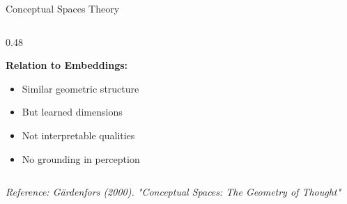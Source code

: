 \documentclass[aspectratio=169]{beamer}
\begin{document}
\begin{frame}[shrink=10]{Conceptual Spaces Theory 🌌}
\begin{columns}[T]
\begin{column}{0.48\textwidth}
\begin{center}
\end{center}

\vspace{0.5em}
\textbf{Relation to Embeddings:}
\begin{itemize}\setlength{\itemsep}{0pt}
    \item Similar geometric structure
    \item But learned dimensions
    \item Not interpretable qualities
    \item No grounding in perception
\end{itemize}
\end{column}
\end{columns}

\vspace{0.5em}
\small
\textit{Reference: Gärdenfors (2000). "Conceptual Spaces: The Geometry of Thought"}
\end{frame}
\end{document}
